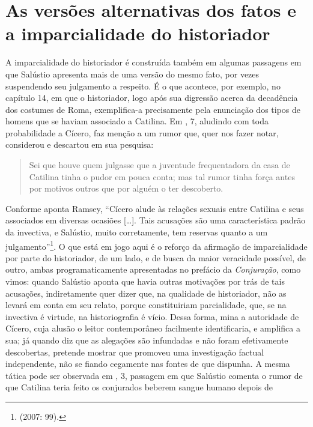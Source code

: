 \section{As versões alternativas dos fatos e  a imparcialidade do historiador}

 A imparcialidade do historiador é construída também em algumas passagens em
 que Salústio apresenta mais de uma versão do mesmo fato, por vezes suspendendo
 seu julgamento a respeito. É o que acontece, por exemplo, no capítulo 14, em
 que o historiador, logo após sua digressão acerca da decadência dos costumes
 de Roma, exemplifica-a precisamente pela enunciação dos tipos de homens que se
 haviam associado a Catilina. Em , 7, aludindo com toda probabilidade a
 Cícero, faz menção a um rumor que, quer nos fazer notar, considerou e
 descartou em sua pesquisa: \begin{quote} Sei que houve quem julgasse que a
 juventude frequentadora da casa de Catilina tinha o pudor em pouca conta; mas
 tal rumor tinha força antes por motivos outros que por alguém o ter
 descoberto.  \end{quote} Conforme aponta Ramsey, “Cícero alude às relações
 sexuais entre Catilina e seus associados em diversas ocasiões [\ldots{}]. Tais
 acusações são uma característica padrão da invectiva, e Salústio, muito
 corretamente, tem reservas quanto a um julgamento”\footnote{  (2007:
 99).}. %
   O que está em jogo aqui é o reforço da afirmação de
 imparcialidade por parte do historiador, de um lado, e de busca da maior
 veracidade possível, de outro, ambas programaticamente apresentadas no
 prefácio da \emph{Conjuração}, como vimos: quando Salústio aponta que havia
 outras motivações por trás de tais acusações, indiretamente quer dizer que, na
 qualidade de historiador, não as levará em conta em seu relato, porque
 constituiriam parcialidade, que, se na invectiva é virtude, na historiografia
 é vício. 
 Dessa forma, mina a autoridade
 de Cícero, cuja alusão o leitor contemporâneo facilmente identificaria, e
 amplifica a sua; já quando diz que as alegações são infundadas e não foram
 efetivamente descobertas, pretende mostrar que promoveu uma investigação
 factual independente, não se fiando cegamente nas fontes de que dispunha.  A
 mesma tática pode ser observada em , 3, passagem em que Salústio comenta o
 rumor de que Catilina teria feito os conjurados beberem sangue humano depois de
